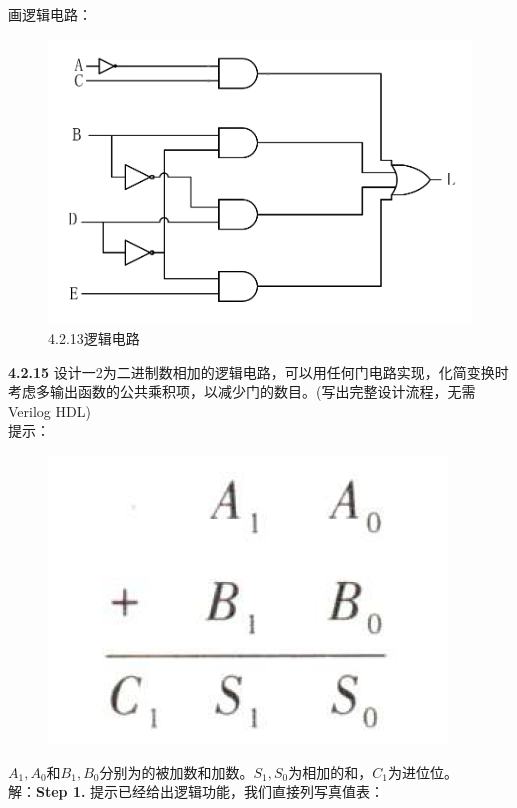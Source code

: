 \documentclass[a4paper,11pt,UTF8]{article}
\begin{document}
画逻辑电路：
\begin{figure}[H]
	\centering
	\includegraphics[scale=0.25]{SD4.2.13}
	\caption{4.2.13逻辑电路}
\end{figure}
\textbf{4.2.15} 设计一2为二进制数相加的逻辑电路，可以用任何门电路实现，化简变换时考虑多输出函数的公共乘积项，以减少门的数目。(写出完整设计流程，无需Verilog HDL)\\
提示：
\begin{figure}[H]
	\centering
	\includegraphics[scale=0.30]{SD4.2.15}
\end{figure}
$A_1,A_0$和$B_1,B_0$分别为的被加数和加数。$S_1,S_0$为相加的和，$C_1$为进位位。\\
解：\textbf{Step 1.} 提示已经给出逻辑功能，我们直接列写真值表：
\end{document}
